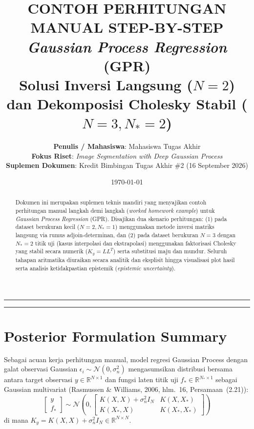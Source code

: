 \documentclass[11pt,a4paper]{article}
\title{
    \vspace{-1.0cm}
    \textbf{\Large CONTOH PERHITUNGAN MANUAL STEP-BY-STEP} \\[0.3em]
    \textbf{\large \textit{Gaussian Process Regression} (GPR)} \\[0.2em]
    \textbf{\normalsize Solusi Inversi Langsung ($N = 2$) dan Dekomposisi Cholesky Stabil ($N = 3, N_* = 2$)}
}
\author{
    \textbf{Penulis / Mahasiswa}: Mahasiswa Tugas Akhir \\
    \textbf{Fokus Riset}: \textit{Image Segmentation with Deep Gaussian Process} \\
    \textbf{Suplemen Dokumen}: Kredit Bimbingan Tugas Akhir \#2 (16 September 2026)
}
\date{\today}
\def\mathbf#1{#1}%
\newcommand{\citep}[2][]{(Rasmussen \& Williams, 2006\if\relax\detokenize{#1}\relax\else, #1\fi)}
\begin{document}
\maketitle
\vspace{-0.5cm}

\begin{abstract}
Dokumen ini merupakan suplemen teknis mandiri yang menyajikan contoh perhitungan manual langkah demi langkah (\textit{worked homework example}) untuk \textit{Gaussian Process Regression} (GPR). Disajikan dua skenario perhitungan: (1) pada dataset berukuran kecil ($N = 2, N_* = 1$) menggunakan metode inversi matriks langsung via rumus adjoin-determinan, dan (2) pada dataset berukuran $N = 3$ dengan $N_* = 2$ titik uji (kasus interpolasi dan ekstrapolasi) menggunakan faktorisasi Cholesky yang stabil secara numerik ($K_y = L L^T$) serta substitusi maju dan mundur. Seluruh tahapan aritmatika diuraikan secara analitik dan eksplisit hingga visualisasi plot hasil serta analisis ketidakpastian epistemik (\textit{epistemic uncertainty}).
\end{abstract}

\hrule
\vspace{0.3cm}
\tableofcontents
\vspace{0.4cm}
\hrule

\newpage

\section{Posterior Formulation Summary}
\label{sec:formulasi_ringkas}

Sebagai acuan kerja perhitungan manual, model regresi Gaussian Process dengan galat observasi Gaussian $\epsilon_i \sim \mathcal{N}(0, \sigma_n^2)$ mengasumsikan distribusi bersama antara target observasi $\mathbf{y} \in \mathbb{R}^{N \times 1}$ dan fungsi laten titik uji $\mathbf{f}_* \in \mathbb{R}^{N_* \times 1}$ sebagai Gaussian multivariat \citep[hlm.~16, Persamaan~(2.21)]{rasmussen2006}:
\begin{equation}
\begin{bmatrix} \mathbf{y} \\ \mathbf{f}_* \end{bmatrix}
\sim \mathcal{N}\left(
\mathbf{0},
\begin{bmatrix}
K(X, X) + \sigma_n^2 I_N & K(X, X_*) \\
K(X_*, X) & K(X_*, X_*)
\end{bmatrix}
\right)
\end{equation}
di mana $K_y = K(X, X) + \sigma_n^2 I_N \in \mathbb{R}^{N \times N}$.
\end{document}
